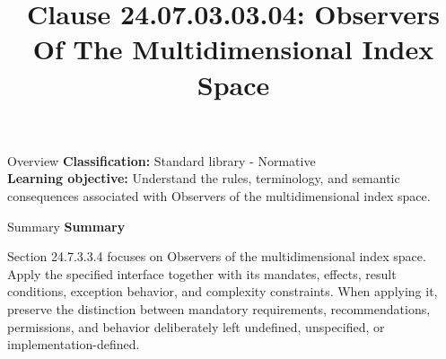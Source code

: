 \documentclass[10pt,letterpaper]{article}
\title{Clause 24.07.03.03.04: Observers Of The Multidimensional Index Space}
\author{}
\date{}
\begin{document}
\maketitle
\begin{CornellOverviewBox}{Overview}
\textbf{Classification:} Standard library - Normative\\[2pt]
\textbf{Learning objective:} Understand the rules, terminology, and semantic consequences associated with Observers of the multidimensional index space.
\end{CornellOverviewBox}\begin{CornellSummaryBox}{Summary}
{\sffamily\bfseries\color{Accent} Summary}\par\vspace{3pt}Section 24.7.3.3.4 focuses on Observers of the multidimensional index space. Apply the specified interface together with its mandates, effects, result conditions, exception behavior, and complexity constraints. When applying it, preserve the distinction between mandatory requirements, recommendations, permissions, and behavior deliberately left undefined, unspecified, or implementation-defined.
\end{CornellSummaryBox}
\end{document}
